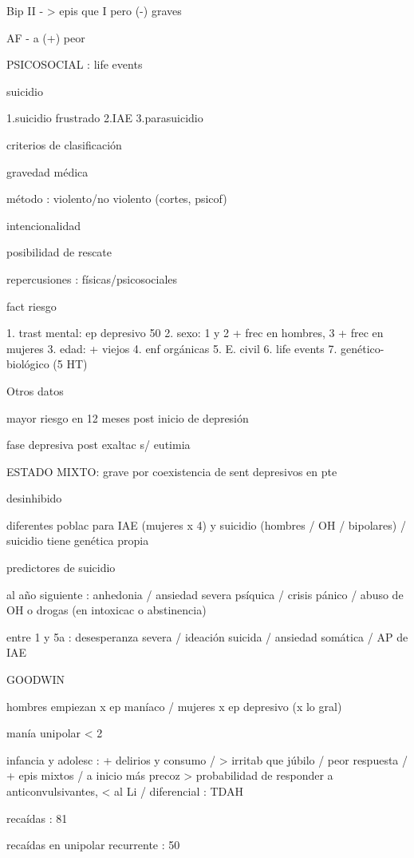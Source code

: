Bip II - > epis que I pero (-) graves

AF - a (+) peor

PSICOSOCIAL : life events

suicidio

1.suicidio frustrado
2.IAE
3.parasuicidio

criterios de clasificación

gravedad médica

método : violento/no violento (cortes, psicof)

intencionalidad

posibilidad de rescate

repercusiones : físicas/psicosociales

fact riesgo

1. trast mental: ep depresivo 50%
2. sexo: 1 y 2 + frec en hombres, 3 + frec en mujeres
3. edad: + viejos
4. enf orgánicas
5. E. civil
6. life events
7. genético-biológico (5 HT)

Otros datos

mayor riesgo en 12 meses post inicio de depresión

fase depresiva post exaltac s/ eutimia

ESTADO MIXTO: grave por coexistencia de sent depresivos en pte

desinhibido

diferentes poblac para IAE (mujeres x 4) y suicidio (hombres / OH / bipolares) / suicidio tiene genética propia

predictores de suicidio

al año siguiente : anhedonia / ansiedad severa psíquica / crisis pánico / abuso de OH o drogas (en intoxicac o abstinencia)

entre 1 y 5a : desesperanza severa / ideación suicida / ansiedad somática / AP de IAE

GOODWIN

hombres empiezan x ep maníaco / mujeres x ep depresivo (x lo gral)

manía unipolar < 2%

infancia y adolesc : + delirios y consumo / > irritab que júbilo / peor respuesta / + epis mixtos / a inicio más precoz > probabilidad de responder a anticonvulsivantes, < al Li / diferencial : TDAH

recaídas : 81%

recaídas en unipolar recurrente : 50%

